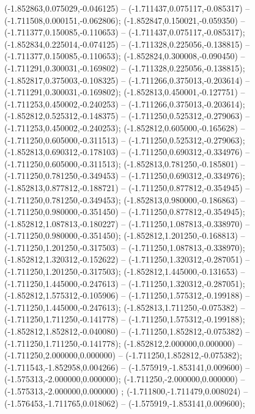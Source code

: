  (-1.852863,0.075029,-0.046125) -- (-1.711437,0.075117,-0.085317) -- (-1.711508,0.000151,-0.062806);
 (-1.852847,0.150021,-0.059350) -- (-1.711377,0.150085,-0.110653) -- (-1.711437,0.075117,-0.085317);
 (-1.852834,0.225014,-0.074125) -- (-1.711328,0.225056,-0.138815) -- (-1.711377,0.150085,-0.110653);
 (-1.852824,0.300008,-0.090450) -- (-1.711291,0.300031,-0.169802) -- (-1.711328,0.225056,-0.138815);
 (-1.852817,0.375003,-0.108325) -- (-1.711266,0.375013,-0.203614) -- (-1.711291,0.300031,-0.169802);
 (-1.852813,0.450001,-0.127751) -- (-1.711253,0.450002,-0.240253) -- (-1.711266,0.375013,-0.203614);
 (-1.852812,0.525312,-0.148375) -- (-1.711250,0.525312,-0.279063) -- (-1.711253,0.450002,-0.240253);
 (-1.852812,0.605000,-0.165628) -- (-1.711250,0.605000,-0.311513) -- (-1.711250,0.525312,-0.279063);
 (-1.852813,0.690312,-0.178103) -- (-1.711250,0.690312,-0.334976) -- (-1.711250,0.605000,-0.311513);
 (-1.852813,0.781250,-0.185801) -- (-1.711250,0.781250,-0.349453) -- (-1.711250,0.690312,-0.334976);
 (-1.852813,0.877812,-0.188721) -- (-1.711250,0.877812,-0.354945) -- (-1.711250,0.781250,-0.349453);
 (-1.852813,0.980000,-0.186863) -- (-1.711250,0.980000,-0.351450) -- (-1.711250,0.877812,-0.354945);
 (-1.852812,1.087813,-0.180227) -- (-1.711250,1.087813,-0.338970) -- (-1.711250,0.980000,-0.351450);
 (-1.852812,1.201250,-0.168813) -- (-1.711250,1.201250,-0.317503) -- (-1.711250,1.087813,-0.338970);
 (-1.852812,1.320312,-0.152622) -- (-1.711250,1.320312,-0.287051) -- (-1.711250,1.201250,-0.317503);
 (-1.852812,1.445000,-0.131653) -- (-1.711250,1.445000,-0.247613) -- (-1.711250,1.320312,-0.287051);
 (-1.852812,1.575312,-0.105906) -- (-1.711250,1.575312,-0.199188) -- (-1.711250,1.445000,-0.247613);
 (-1.852813,1.711250,-0.075382) -- (-1.711250,1.711250,-0.141778) -- (-1.711250,1.575312,-0.199188);
 (-1.852812,1.852812,-0.040080) -- (-1.711250,1.852812,-0.075382) -- (-1.711250,1.711250,-0.141778);
 (-1.852812,2.000000,0.000000) -- (-1.711250,2.000000,0.000000) -- (-1.711250,1.852812,-0.075382);
 (-1.711543,-1.852958,0.004266) -- (-1.575919,-1.853141,0.009600) -- (-1.575313,-2.000000,0.000000);
 (-1.711250,-2.000000,0.000000) -- (-1.575313,-2.000000,0.000000) ;
 (-1.711800,-1.711479,0.008024) -- (-1.576453,-1.711765,0.018062) -- (-1.575919,-1.853141,0.009600);
